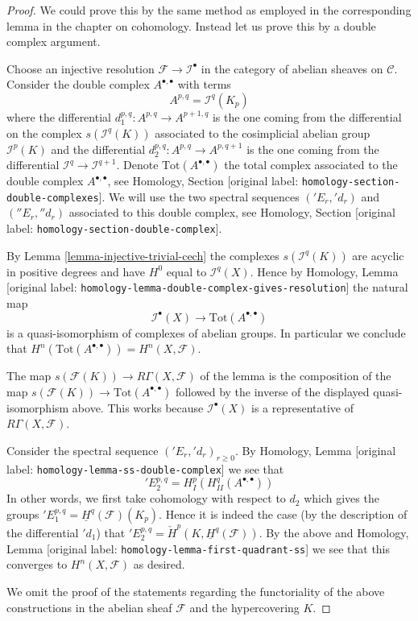 \documentclass[10pt,a4paper]{article}
\theoremstyle{plain}
\theoremstyle{definition}
\theoremstyle{remark}
\numberwithin{equation}{subsection}
\begin{document}
\begin{proof}
We could prove this by the same method as employed in the corresponding
lemma in the chapter on cohomology. Instead let us prove this by a
double complex argument.

\medskip\noindent
Choose an injective resolution $\mathcal{F} \to \mathcal{I}^\bullet$
in the category of abelian sheaves on $\mathcal{C}$. Consider the
double complex $A^{\bullet, \bullet}$ with terms
$$
A^{p, q} = \mathcal{I}^q(K_p)
$$
where the differential $d_1^{p, q} : A^{p, q} \to A^{p + 1, q}$ is the one
coming from the differential on the complex $s(\mathcal{I}^q(K))$
associated to the cosimplicial abelian group $\mathcal{I}^p(K)$
and the differential $d_2^{p, q} : A^{p, q} \to A^{p, q + 1}$ is the one
coming from the differential $\mathcal{I}^q \to \mathcal{I}^{q + 1}$.
Denote $\text{Tot}(A^{\bullet, \bullet})$ the total complex associated to
the double complex $A^{\bullet, \bullet}$, see
Homology, Section \textnormal{[original label: \nolinkurl{homology-section-double-complexes}]}.
We will use the two spectral
sequences $({}'E_r, {}'d_r)$ and $({}''E_r, {}''d_r)$
associated to this double complex, see
Homology, Section \textnormal{[original label: \nolinkurl{homology-section-double-complex}]}.

\medskip\noindent
By Lemma \ref{lemma-injective-trivial-cech}
the complexes $s(\mathcal{I}^q(K))$ are acyclic in
positive degrees and have $H^0$ equal to $\mathcal{I}^q(X)$.
Hence by
Homology, Lemma \textnormal{[original label: \nolinkurl{homology-lemma-double-complex-gives-resolution}]}
the natural map
$$
\mathcal{I}^\bullet(X) \longrightarrow \text{Tot}(A^{\bullet, \bullet})
$$
is a quasi-isomorphism of complexes of abelian groups. In particular
we conclude that $H^n(\text{Tot}(A^{\bullet, \bullet})) = H^n(X, \mathcal{F})$.

\medskip\noindent
The map $s(\mathcal{F}(K)) \longrightarrow R\Gamma(X, \mathcal{F})$ of
the lemma is the composition of the map
$s(\mathcal{F}(K)) \to \text{Tot}(A^{\bullet, \bullet})$
followed by the inverse
of the displayed quasi-isomorphism above. This works because
$\mathcal{I}^\bullet(X)$ is a representative of $R\Gamma(X, \mathcal{F})$.

\medskip\noindent
Consider the spectral sequence $({}'E_r, {}'d_r)_{r \geq 0}$. By
Homology, Lemma \textnormal{[original label: \nolinkurl{homology-lemma-ss-double-complex}]}
we see that
$$
{}'E_2^{p, q} = H^p_I(H^q_{II}(A^{\bullet, \bullet}))
$$
In other words, we first take cohomology with respect to
$d_2$ which gives the groups
${}'E_1^{p, q} = \underline{H}^q(\mathcal{F})(K_p)$.
Hence it is indeed the case (by the description of the differential
${}'d_1$) that
${}'E_2^{p, q} = \check{H}^p(K, \underline{H}^q(\mathcal{F}))$.
By the above and Homology, Lemma \textnormal{[original label: \nolinkurl{homology-lemma-first-quadrant-ss}]}
we see that this converges to $H^n(X, \mathcal{F})$ as desired.

\medskip\noindent
We omit the proof of the statements regarding the functoriality of
the above constructions in the abelian sheaf $\mathcal{F}$ and the
hypercovering $K$.
\end{proof}
\end{document}
